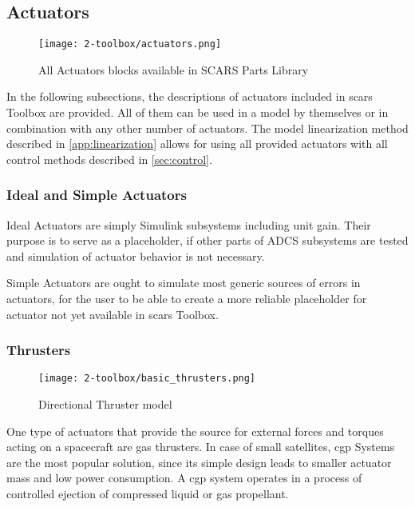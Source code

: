 \subsection{Actuators}\label{sec:actuators}
    \begin{figure}[H]
        \centering
        \texttt{[image: 2-toolbox/actuators.png]}
        \caption{All Actuators blocks available in SCARS Parts Library}
        \label{fig:actuators}
    \end{figure}
    In the following subsections, the descriptions of actuators included in \ac{scars} Toolbox are provided. All of them can be used in a model by themselves or in combination with any other number of actuators. The model linearization method described in \autoref{app:linearization} allows for using all provided actuators with all control methods described in \autoref{sec:control}. 

    \subsubsection{Ideal and Simple Actuators}
        Ideal Actuators are simply Simulink subsystems including unit gain. Their purpose is to serve as a placeholder, if other parts of ADCS subsystems are tested and simulation of actuator behavior is not necessary.

        Simple Actuators are ought to simulate most generic sources of errors in actuators, for the user to be able to create a more reliable placeholder for actuator not yet available in \ac{scars} Toolbox.


    \subsubsection{Thrusters}

        \begin{figure}[H]
            \centering
            \texttt{[image: 2-toolbox/basic\_thrusters.png]}
            \caption{Directional Thruster model}
            \label{fig:basic_thrusters}
        \end{figure}

        One type of actuators that provide the source for external forces and torques acting on a spacecraft are gas thrusters. In case of small satellites, \ac{cgp} Systems are the most popular solution, since its simple design leads to smaller actuator mass and low power consumption. A \ac{cgp} system operates in a process of controlled ejection of compressed liquid or gas propellant. 
        
